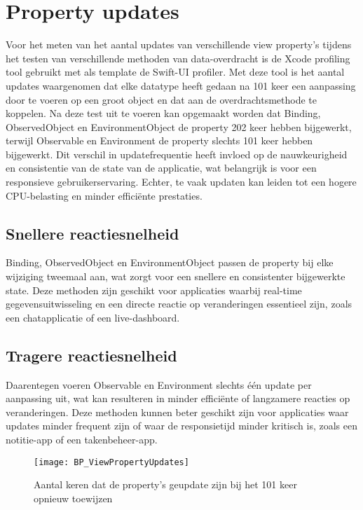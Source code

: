 \newpage
\section{Property updates}
Voor het meten van het aantal updates van verschillende view property's tijdens het testen van verschillende methoden van data-overdracht is de Xcode profiling tool gebruikt met als template de Swift-UI profiler. Met deze tool is het aantal updates waargenomen dat elke datatype heeft gedaan na 101 keer een aanpassing door te voeren op een groot object en dat aan de overdrachtsmethode te koppelen. Na deze test uit te voeren kan opgemaakt worden dat Binding, ObservedObject en EnvironmentObject de property 202 keer hebben bijgewerkt, terwijl Observable en Environment de property slechts 101 keer hebben bijgewerkt. Dit verschil in updatefrequentie heeft invloed op de nauwkeurigheid en consistentie van de state van de applicatie, wat belangrijk is voor een responsieve gebruikerservaring. Echter, te vaak updaten kan leiden tot een hogere CPU-belasting en minder efficiënte prestaties.

\subsection{Snellere reactiesnelheid}
Binding, ObservedObject en EnvironmentObject passen de property bij elke wijziging tweemaal aan, wat zorgt voor een snellere en consistenter bijgewerkte state. Deze methoden zijn geschikt voor applicaties waarbij real-time gegevensuitwisseling en een directe reactie op veranderingen essentieel zijn, zoals een chatapplicatie of een live-dashboard.

\subsection{Tragere reactiesnelheid}
Daarentegen voeren Observable en Environment slechts één update per aanpassing uit, wat kan resulteren in minder efficiënte of langzamere reacties op veranderingen. Deze methoden kunnen beter geschikt zijn voor applicaties waar updates minder frequent zijn of waar de responsietijd minder kritisch is, zoals een notitie-app of een takenbeheer-app.


\begin{figure}[htbp]
    \centering
    \texttt{[image: BP\_ViewPropertyUpdates]} 
    \caption{Aantal keren dat de property's geupdate zijn bij het 101 keer opnieuw toewijzen}
    \label{fig:propertyUpdates}
\end{figure}

